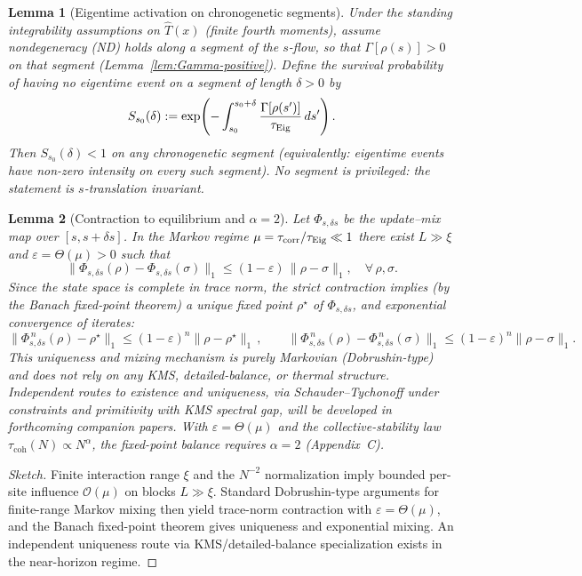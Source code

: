 \documentclass[12pt,a4paper]{article}
\newtheorem{lemma}{Lemma}[section]
\numberwithin{equation}{section}
\begin{document}
\begin{lemma}[Eigentime activation on chronogenetic segments]
\label{lem:eigentime-activation}
Under the standing integrability assumptions on $\hat T(x)$ (finite fourth
moments), assume nondegeneracy (ND) holds along a segment of the $s$-flow, so that
$\Gamma[\rho(s)]>0$ on that segment (Lemma~\ref{lem:Gamma-positive}).
Define the survival probability of having no eigentime event on a segment of length
$\delta>0$ by
\[
S_{s_0}(\delta):=\exp\!\left(-\int_{s_0}^{s_0+\delta}\frac{\Gamma[\rho(s')]}{\tau_{\rm Eig}}\,ds'\right).
\]
Then $S_{s_0}(\delta)<1$ on any chronogenetic segment (equivalently: eigentime events have
non-zero intensity on every such segment). No segment is privileged: the statement is
$s$-translation invariant.
\end{lemma}

\begin{lemma}[Contraction to equilibrium and $\alpha=2$]
\label{lem:contraction}
Let $\Phi_{s,\delta s}$ be the update--mix map over $[s,s+\delta s]$. In
the Markov regime $\mu=\tau_{\mathrm{corr}}/\tau_{\rm Eig}\ll 1$ there exist
$L\gg\xi$ and $\varepsilon=\Theta(\mu)>0$ such that
\[
\|\Phi_{s,\delta s}(\rho)-\Phi_{s,\delta s}(\sigma)\|_1
\le (1-\varepsilon)\,\|\rho-\sigma\|_1,\quad\forall\,\rho,\sigma.
\]
Since the state space is complete in trace norm, the strict contraction 
implies (by the Banach fixed-point theorem) a unique fixed point 
$\rho^\star$ of $\Phi_{s,\delta s}$, and exponential convergence of 
iterates:
\[
\|\Phi_{s,\delta s}^{\,n}(\rho)-\rho^\star\|_1 \le (1-\varepsilon)^n\|\rho-\rho^\star\|_1\,,\qquad
\|\Phi_{s,\delta s}^{\,n}(\rho)-\Phi_{s,\delta s}^{\,n}(\sigma)\|_1 \le (1-\varepsilon)^n\|\rho-\sigma\|_1.
\]
This uniqueness and mixing mechanism is purely Markovian (Dobrushin-type) 
and does not rely on any KMS, detailed-balance, or thermal structure. 
Independent routes to existence and uniqueness, via Schauder--Tychonoff 
under constraints and primitivity with KMS spectral gap, will be developed 
in forthcoming companion papers. With $\varepsilon=\Theta(\mu)$ and the 
collective-stability law $\tau_{\mathrm{coh}}(N)\propto N^\alpha$, the 
fixed-point balance requires $\alpha=2$ (Appendix~C).
\end{lemma}

\begin{proof}[Sketch]
Finite interaction range $\xi$ and the $N^{-2}$ normalization imply bounded per-site influence
$\mathcal{O}(\mu)$ on blocks $L\gg\xi$. Standard Dobrushin-type arguments for finite-range
Markov mixing then yield trace-norm contraction with $\varepsilon=\Theta(\mu)$, and the
Banach fixed-point theorem gives uniqueness and exponential mixing.
An independent uniqueness route via KMS/detailed-balance specialization exists in the near-horizon regime.
\end{proof}
\end{document}
